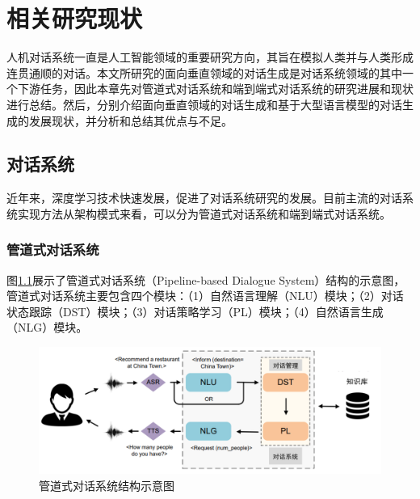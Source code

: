 \chapter{相关研究现状}

人机对话系统一直是人工智能领域的重要研究方向，其旨在模拟人类并与人类形成连贯通顺的对话。本文所研究的面向垂直领域的对话生成是对话系统领域的其中一个下游任务，因此本章先对管道式对话系统和端到端式对话系统的研究进展和现状进行总结。然后，分别介绍面向垂直领域的对话生成和基于大型语言模型的对话生成的发展现状，并分析和总结其优点与不足。

\section{对话系统}

近年来，深度学习技术快速发展，促进了对话系统研究的发展\cite{JSJX201907001}。目前主流的对话系统实现方法从架构模式来看，可以分为管道式对话系统和端到端式对话系统。

\subsection{管道式对话系统}

图\ref{pipeline_dialogue_system}展示了管道式对话系统（Pipeline-based Dialogue System）结构的示意图，管道式对话系统主要包含四个模块：（1）自然语言理解（NLU）模块；（2）对话状态跟踪（DST）模块；（3）对话策略学习（PL）模块；（4）自然语言生成（NLG）模块。

\begin{figure}[htbp]
	\centering
	\includegraphics[scale=0.55]{Fig/pipeline_dialogue_system.png}
	\caption{\label{pipeline_dialogue_system}管道式对话系统结构示意图\cite{DBLP:journals/air/NiYPXC23}}
\end{figure}


